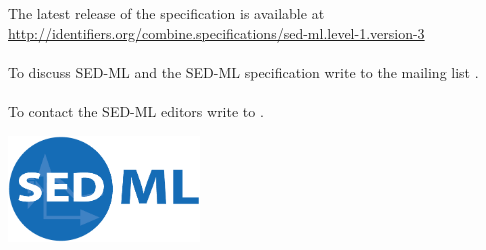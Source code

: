 \begin{titlepage}
\begin{center}
\normalsize
\begin{minipage}{5in}
\begin{center}
  The latest release of the \currentLV specification is available at
  \url{http://identifiers.org/combine.specifications/sed-ml.level-1.version-3}
  \paragraph*{}
  To discuss SED-ML and the SED-ML specification write to the mailing list .

  \paragraph*{}
  To contact the SED-ML editors write to .
\end{center}
\end{minipage}
\vfill


\centerline{\includegraphics[width=2in]{images/logoSedml.png}}

\end{center}

\end{titlepage}

%
%

\setcounter{page}{2}



